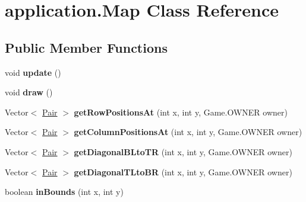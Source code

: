 \hypertarget{classapplication_1_1_map}{\section{application.\+Map Class Reference}
\label{classapplication_1_1_map}
}
\subsection*{Public Member Functions}
\begin{DoxyCompactItemize}
\item 
\hypertarget{classapplication_1_1_map_a405c4fa754f25e33bd8eafee061d1c5d}{void {\bfseries update} ()}\label{classapplication_1_1_map_a405c4fa754f25e33bd8eafee061d1c5d}

\item 
\hypertarget{classapplication_1_1_map_a0b9639952785a325be6f0251e4120658}{void {\bfseries draw} ()}\label{classapplication_1_1_map_a0b9639952785a325be6f0251e4120658}

\item 
\hypertarget{classapplication_1_1_map_a0bdc2326a0f637cc37877f480546e8cd}{Vector$<$ \hyperlink{classapplication_1_1_pair}{Pair} $>$ {\bfseries get\+Row\+Positions\+At} (int x, int y, Game.\+O\+W\+N\+E\+R owner)}\label{classapplication_1_1_map_a0bdc2326a0f637cc37877f480546e8cd}

\item 
\hypertarget{classapplication_1_1_map_a7236d3894ef2460f49341c63ca24d30a}{Vector$<$ \hyperlink{classapplication_1_1_pair}{Pair} $>$ {\bfseries get\+Column\+Positions\+At} (int x, int y, Game.\+O\+W\+N\+E\+R owner)}\label{classapplication_1_1_map_a7236d3894ef2460f49341c63ca24d30a}

\item 
\hypertarget{classapplication_1_1_map_a57789d28a30b28e06bc2f34bfc0ea114}{Vector$<$ \hyperlink{classapplication_1_1_pair}{Pair} $>$ {\bfseries get\+Diagonal\+B\+Lto\+T\+R} (int x, int y, Game.\+O\+W\+N\+E\+R owner)}\label{classapplication_1_1_map_a57789d28a30b28e06bc2f34bfc0ea114}

\item 
\hypertarget{classapplication_1_1_map_af3f89ab9eda95d77a1ea1f135ec69b0a}{Vector$<$ \hyperlink{classapplication_1_1_pair}{Pair} $>$ {\bfseries get\+Diagonal\+T\+Lto\+B\+R} (int x, int y, Game.\+O\+W\+N\+E\+R owner)}\label{classapplication_1_1_map_af3f89ab9eda95d77a1ea1f135ec69b0a}

\item 
\hypertarget{classapplication_1_1_map_a2cbd93ac3f3085fff563bd26a45524ba}{boolean {\bfseries in\+Bounds} (int x, int y)}\label{classapplication_1_1_map_a2cbd93ac3f3085fff563bd26a45524ba}


\end{DoxyCompactItemize}
